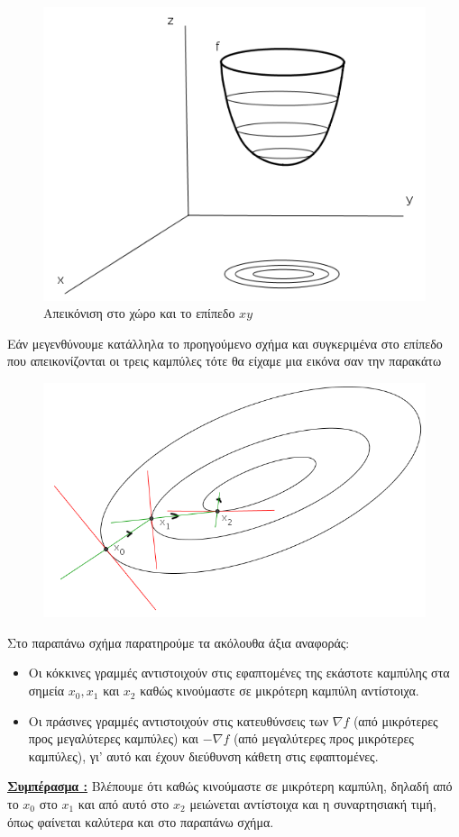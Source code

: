 \documentclass[a4paper,12pt,twoside]{report}
\theoremstyle{plain}
\theoremstyle{definition}
\theoremstyle{remark}
\begin{document}
\begin{figure}[H]
\includegraphics[scale=0.5]{5}
\centering
    \caption{Aπεικόνιση στο χώρο και το επίπεδο $xy$}
\end{figure}

Εάν μεγενθύνουμε κατάλληλα το προηγούμενο σχήμα και συγκεριμένα στο επίπεδο που απεικονίζονται οι τρεις καμπύλες τότε θα είχαμε μια εικόνα σαν την παρακάτω

\begin{figure}[H]
\includegraphics[scale=0.5]{6}
\centering
\end{figure}

Στο παραπάνω σχήμα παρατηρούμε τα ακόλουθα άξια αναφοράς:

\begin{itemize}
\item Οι κόκκινες γραμμές αντιστοιχούν στις εφαπτομένες της εκάστοτε καμπύλης στα σημεία $x_0, x_1$ και $x_2$ καθώς κινούμαστε σε μικρότερη καμπύλη αντίστοιχα.
\item Οι πράσινες γραμμές αντιστοιχούν στις κατευθύνσεις των $\nabla f$ (από μικρότερες προς μεγαλύτερες καμπύλες) και $-\nabla f$ (από μεγαλύτερες προς μικρότερες καμπύλες), γι' αυτό και έχουν διεύθυνση κάθετη στις εφαπτομένες.
\end{itemize}
\underline{\textbf{Συμπέρασμα :}} Βλέπουμε ότι καθώς κινούμαστε σε μικρότερη καμπύλη, δηλαδή από το $x_0$ στο $x_1$ και από αυτό στο $x_2$ μειώνεται αντίστοιχα και η συναρτησιακή τιμή, όπως φαίνεται καλύτερα και στο παραπάνω σχήμα.
\end{document}
